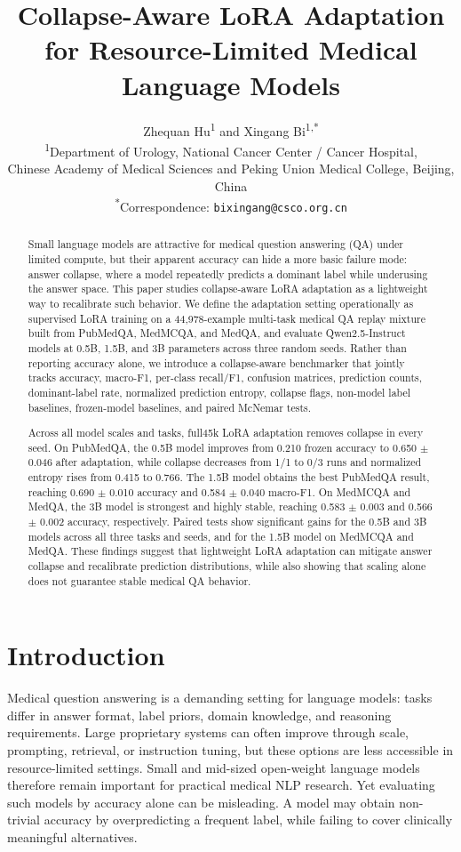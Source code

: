 \documentclass[11pt]{article}
\title{Collapse-Aware LoRA Adaptation for Resource-Limited Medical Language Models}
\author{
Zhequan Hu\textsuperscript{1} and Xingang Bi\textsuperscript{1,*}\\
\textsuperscript{1}Department of Urology, National Cancer Center / Cancer Hospital,\\
Chinese Academy of Medical Sciences and Peking Union Medical College, Beijing, China\\
\textsuperscript{*}Correspondence: \texttt{bixingang@csco.org.cn}
}
\date{}
\begin{document}
\maketitle

\begin{abstract}
Small language models are attractive for medical question answering (QA) under limited compute, but their apparent accuracy can hide a more basic failure mode: answer collapse, where a model repeatedly predicts a dominant label while underusing the answer space. This paper studies collapse-aware LoRA adaptation as a lightweight way to recalibrate such behavior. We define the adaptation setting operationally as supervised LoRA training on a 44,978-example multi-task medical QA replay mixture built from PubMedQA, MedMCQA, and MedQA, and evaluate Qwen2.5-Instruct models at 0.5B, 1.5B, and 3B parameters across three random seeds. Rather than reporting accuracy alone, we introduce a collapse-aware benchmarker that jointly tracks accuracy, macro-F1, per-class recall/F1, confusion matrices, prediction counts, dominant-label rate, normalized prediction entropy, collapse flags, non-model label baselines, frozen-model baselines, and paired McNemar tests.

Across all model scales and tasks, full45k LoRA adaptation removes collapse in every seed. On PubMedQA, the 0.5B model improves from 0.210 frozen accuracy to 0.650 $\pm$ 0.046 after adaptation, while collapse decreases from 1/1 to 0/3 runs and normalized entropy rises from 0.415 to 0.766. The 1.5B model obtains the best PubMedQA result, reaching 0.690 $\pm$ 0.010 accuracy and 0.584 $\pm$ 0.040 macro-F1. On MedMCQA and MedQA, the 3B model is strongest and highly stable, reaching 0.583 $\pm$ 0.003 and 0.566 $\pm$ 0.002 accuracy, respectively. Paired tests show significant gains for the 0.5B and 3B models across all three tasks and seeds, and for the 1.5B model on MedMCQA and MedQA. These findings suggest that lightweight LoRA adaptation can mitigate answer collapse and recalibrate prediction distributions, while also showing that scaling alone does not guarantee stable medical QA behavior.
\end{abstract}

\section{Introduction}

Medical question answering is a demanding setting for language models: tasks differ in answer format, label priors, domain knowledge, and reasoning requirements. Large proprietary systems can often improve through scale, prompting, retrieval, or instruction tuning, but these options are less accessible in resource-limited settings. Small and mid-sized open-weight language models therefore remain important for practical medical NLP research. Yet evaluating such models by accuracy alone can be misleading. A model may obtain non-trivial accuracy by overpredicting a frequent label, while failing to cover clinically meaningful alternatives.
\end{document}
